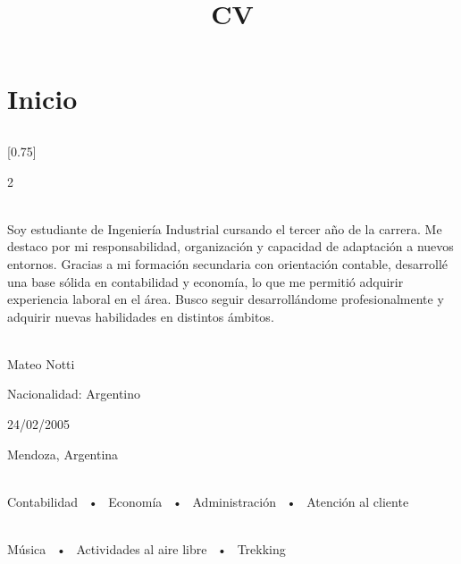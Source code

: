 \documentclass[lighthipster]{simplehipstercv}
\title{CV}
\author{}
\date{}
\begin{document}
\thispagestyle{empty}

\section*{Inicio}


\subsection*{}
\vspace{4em}

\setlength{\columnsep}{1.5cm}
[0.75]
\begin{paracol}{2}

\paracolbackgroundoptions

\footnotesize
{\setasidefontcolour
\flushright
\begin{center}
\end{center}

\\[0.5em]

{\footnotesize
Soy estudiante de Ingeniería Industrial cursando el tercer año de la carrera. Me destaco por mi responsabilidad, organización y capacidad de adaptación a nuevos entornos. Gracias a mi formación secundaria con orientación contable, desarrollé una base sólida en contabilidad y economía, lo que me permitió adquirir experiencia laboral en el área. Busco seguir desarrollándome profesionalmente y adquirir nuevas habilidades en distintos ámbitos.}
\bigskip

 \\[0.5em]
Mateo Notti

Nacionalidad: Argentino 

24/02/2005

Mendoza, Argentina

\bigskip

 \\[0.5em]

Contabilidad ~•~ Economía ~•~ Administración ~•~ Atención al cliente

\bigskip

\\[0.5em]

Música ~•~ Actividades al aire libre ~•~ Trekking
\bigskip

}
\end{paracol}
\end{document}
